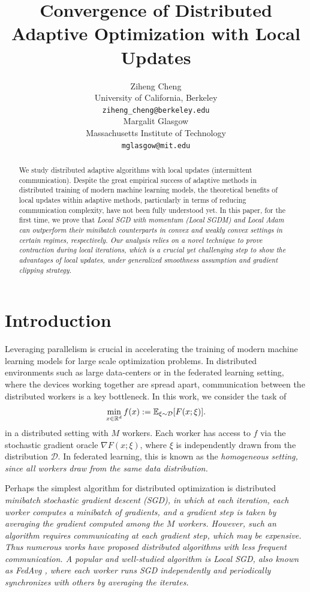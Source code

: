 \documentclass{article} %
\title{Convergence of Distributed Adaptive Optimization with Local Updates}
\author{Ziheng Cheng \\
University of California, Berkeley \\
\texttt{ziheng\_cheng@berkeley.edu} \\
\And
Margalit Glasgow \\
Massachusetts Institute of Technology \\
\texttt{mglasgow@mit.edu}
}
\numberwithin{equation}{section}
\begin{document}
\maketitle

\begin{abstract}
    We study distributed adaptive algorithms with local updates (intermittent communication). 
    Despite the great empirical success of adaptive methods in distributed training of modern machine learning models, the theoretical benefits of local updates within adaptive methods, particularly in terms of reducing communication complexity, have not been fully understood yet. 
    In this paper, for the first time, we prove that \em Local SGD \em with momentum (\em Local \em  SGDM) and \em Local \em  Adam can outperform their minibatch counterparts in convex and weakly convex settings in certain regimes, respectively.
    Our analysis relies on a novel technique to prove contraction during local iterations, which is a crucial yet challenging step to show the advantages of local updates, under generalized smoothness assumption and gradient clipping strategy.
\end{abstract}

\section{Introduction}

Leveraging parallelism is crucial in accelerating the training of modern machine learning models for large scale optimization problems. In distributed environments such as large data-centers or in the federated learning setting, where the devices working together are spread apart, communication between the distributed workers is a key bottleneck.
In this work, we consider the task of
\begin{equation}
    \min_{x\in \mathbb{R}^d} f(x):= \mathbb{E}_{\xi\sim\mathcal{D}} [F(x;\xi)].
\end{equation}
in a distributed setting with $M$ workers. Each worker has access to $f$ via the stochastic gradient oracle $\nabla F(x;\xi)$, where $\xi$ is independently drawn from the distribution $\mathcal{D}$. In federated learning, this is known as the \em homogeneous \em setting, since all workers draw from the same data distribution.

Perhaps the simplest algorithm for distributed optimization is distributed \em minibatch stochastic gradient descent (SGD), \em in which at each iteration, each worker computes a minibatch of gradients, and a gradient step is taken by averaging the gradient computed among the $M$ workers. However, such an algorithm requires communicating at each gradient step, which may be expensive. Thus numerous works have proposed distributed algorithms with less frequent communication. A popular and well-studied algorithm is \em Local \em  SGD, also known as FedAvg \citep{mcmahan2017communication}, where each worker runs SGD independently and periodically synchronizes with others by averaging the iterates.
\end{document}
